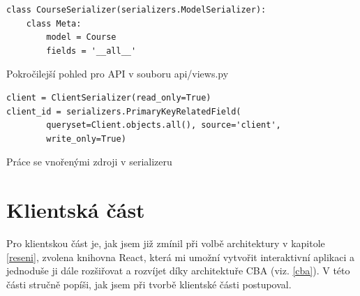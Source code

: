     \begin{listing}[ht]
    	\begin{verbatim}
class CourseSerializer(serializers.ModelSerializer):
    class Meta:
        model = Course
        fields = '__all__'
    	\end{verbatim}
    	\caption{Pokročilejší pohled pro API v souboru api/views.py}\label{lst:apiserializer1}
    \end{listing}
    
    \begin{listing}[ht]
    	\begin{verbatim}
client = ClientSerializer(read_only=True)
client_id = serializers.PrimaryKeyRelatedField(
        queryset=Client.objects.all(), source='client',
        write_only=True)
    	\end{verbatim}
    	\caption{Práce se vnořenými zdroji v serializeru}\label{lst:apiserializer2}
    \end{listing}
    
    \section{Klientská část}
    Pro klientskou část je, jak jsem již zmínil při volbě architektury v kapitole \ref{reseni}, zvolena knihovna React, která mi umožní vytvořit interaktivní aplikaci a jednoduše ji dále rozšiřovat a rozvíjet díky architektuře CBA (viz. \ref{cba}). V této části stručně popíši, jak jsem při tvorbě klientské části postupoval.
    
